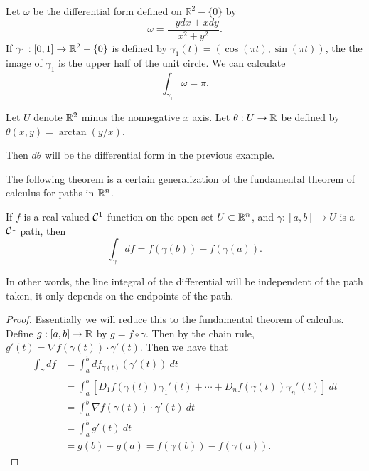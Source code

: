 \begin{example}
Let $\omega$ be the differential form defined on $\mathbb{R}^2 - \{0\}$ by 
\[\omega = \frac{-ydx + xdy}{x^2 + y^2}.\]
If $\gamma_1: [0, 1] \to \mathbb{R}^2 - \{0\}$ is defined by $\gamma_1(t) = (\cos(\pi t), \sin(\pi t))$, the the image of $\gamma_1$ is the upper half of the unit circle. We can calculate
\[\int_{\gamma_1}\omega = \pi.\]
\end{example}

\begin{example}
Let $U$ denote $\mathbb{R}^2$ minus the nonnegative $x$ axis. Let $\theta: U \to \mathbb{R}$ be defined by $\theta(x, y) = \arctan(y/x)$.

Then $d\theta$ will be the differential form in the previous example.
\end{example}

The following theorem is a certain generalization of the fundamental theorem of calculus for paths in $\mathbb{R}^n$.
\begin{theorem}
If $f$ is a real valued $\mathcal{C}^{1}$ function on the open set $U \subset \mathbb{R}^n$, and $\gamma:[a, b] \to U$ is a $\mathcal{C}^{1}$ path, then 
\[\int_{\gamma}df = f(\gamma(b)) - f(\gamma(a)).\]

In other words, the line integral of the differential will be independent of the path taken, it only depends on the endpoints of the path.
\end{theorem}

\begin{proof}
Essentially we will reduce this to the fundamental theorem of calculus. Define $g: [a, b] \to \mathbb{R}$ by $g = f \circ \gamma$. Then by the chain rule, $g'(t) = \nabla f(\gamma(t)) \cdot \gamma'(t)$. Then we have that
\begin{align*}
\int_{\gamma}df &= \int_a^b df_{\gamma(t)}(\gamma'(t))~dt \\
		&= \int_a^b [D_1f(\gamma(t))\gamma_1'(t) + \cdots + D_nf(\gamma(t))\gamma_n'(t)]~dt \\
		&= \int_a^b \nabla f(\gamma(t)) \cdot \gamma'(t)~dt \\
		&= \int_a^b g'(t)~dt \\
		&= g(b) - g(a) = f(\gamma(b)) - f(\gamma(a)).
\end{align*}
\end{proof}
